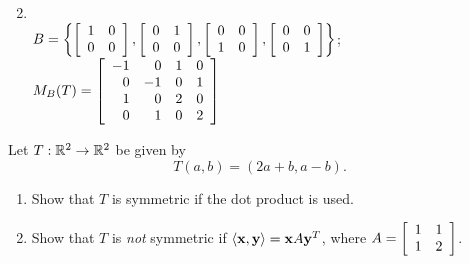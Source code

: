 \begin{multicols}{2}
\begin{ex}
\begin{enumerate}[leftmargin=1em, label={\alph*.}]
\end{enumerate}
\begin{sol}
\begin{enumerate}[label={\alph*.}]
\setcounter{enumi}{1}
\item \hspace{1em} \\
\hspace*{-2em}$B = 
\left\{
\left[ \begin{array}{rr}
1 & 0 \\
0 & 0
\end{array} \right]
,
\left[ \begin{array}{rr}
0 & 1 \\
0 & 0
\end{array} \right]
,
\left[ \begin{array}{rr}
0 & 0 \\
1 & 0
\end{array} \right]
,
\left[ \begin{array}{rr}
0 & 0 \\
0 & 1
\end{array} \right]
\right\}$;
$M_B(T) = 
\left[ \begin{array}{rrrr}
-1 &  0 & 1 & 0 \\
 0 & -1 & 0 & 1 \\
 1 &  0 & 2 & 0 \\
 0 &  1 & 0 & 2
\end{array} \right]
$

\end{enumerate}
\end{sol}
\end{ex}

\begin{ex} \label{ex:10_3_2}
Let $T : \mathbb{R}^2 \to \mathbb{R}^2$ be given by
\begin{equation*}
T(a, b) = (2a + b, a - b).
\end{equation*}
\begin{enumerate}[label={\alph*.}]
\item Show that $T$ is symmetric if the dot product is used.

\item Show that $T$ is \textit{not} symmetric if $\langle\textbf{x}, \textbf{y} \rangle = \textbf{x}A\textbf{y}^{T}$, where $A = 
\left[ \begin{array}{rr}
1 & 1 \\
1 & 2
\end{array} \right]$. \newline [\textit{Hint}: Check that $B = \{(1, 0), (1, -1)\}$ is an orthonormal basis.]


\end{enumerate}
\end{ex}
\end{multicols}
